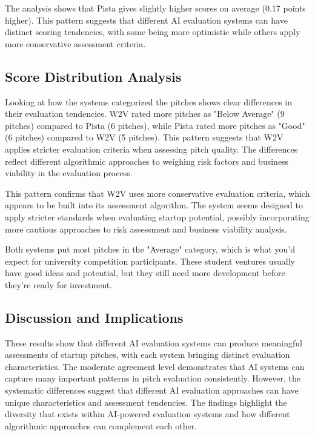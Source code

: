The analysis shows that Pista gives slightly higher scores on average (0.17 points higher). This pattern suggests that different AI evaluation systems can have distinct scoring tendencies, with some being more optimistic while others apply more conservative assessment criteria.

\subsection{Score Distribution Analysis}

Looking at how the systems categorized the pitches shows clear differences in their evaluation tendencies. W2V rated more pitches as "Below Average" (9 pitches) compared to Pista (6 pitches), while Pista rated more pitches as "Good" (6 pitches) compared to W2V (5 pitches). This pattern suggests that W2V applies stricter evaluation criteria when assessing pitch quality. The differences reflect different algorithmic approaches to weighing risk factors and business viability in the evaluation process.

This pattern confirms that W2V uses more conservative evaluation criteria, which appears to be built into its assessment algorithm. The system seems designed to apply stricter standards when evaluating startup potential, possibly incorporating more cautious approaches to risk assessment and business viability analysis.

Both systems put most pitches in the "Average" category, which is what you'd expect for university competition participants. These student ventures usually have good ideas and potential, but they still need more development before they're ready for investment.

\subsection{Discussion and Implications}

These results show that different AI evaluation systems can produce meaningful assessments of startup pitches, with each system bringing distinct evaluation characteristics. The moderate agreement level demonstrates that AI systems can capture many important patterns in pitch evaluation consistently. However, the systematic differences suggest that different AI evaluation approaches can have unique characteristics and assessment tendencies. The findings highlight the diversity that exists within AI-powered evaluation systems and how different algorithmic approaches can complement each other.

